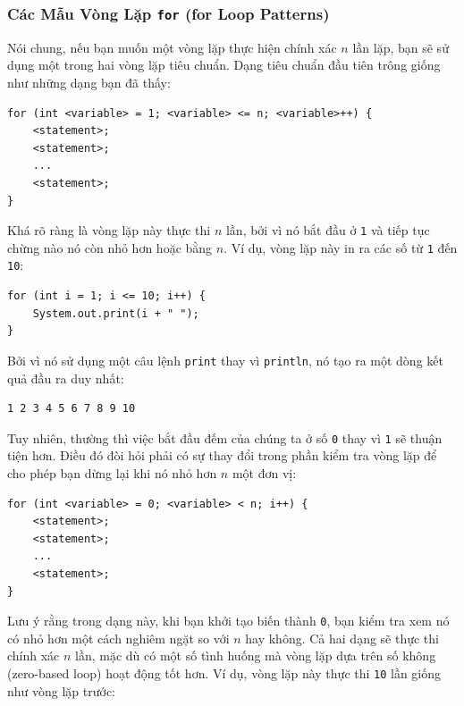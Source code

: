 \subsubsection{\texorpdfstring{Các Mẫu Vòng Lặp \texttt{for} (for Loop
Patterns)}{Các Mẫu Vòng Lặp for (for Loop Patterns)}}\label{cuxe1c-mux1eabu-vuxf2ng-lux1eb7p-for-for-loop-patterns}

Nói chung, nếu bạn muốn một vòng lặp thực hiện chính xác \(n\) lần lặp,
bạn sẽ sử dụng một trong hai vòng lặp tiêu chuẩn. Dạng tiêu chuẩn đầu
tiên trông giống như những dạng bạn đã thấy:

\begin{verbatim}
for (int <variable> = 1; <variable> <= n; <variable>++) {
    <statement>;
    <statement>;
    ...
    <statement>;
}
\end{verbatim}

Khá rõ ràng là vòng lặp này thực thi \(n\) lần, bởi vì nó bắt đầu ở
\texttt{1} và tiếp tục chừng nào nó còn nhỏ hơn hoặc bằng \(n\). Ví dụ,
vòng lặp này in ra các số từ \texttt{1} đến \texttt{10}:

\begin{verbatim}
for (int i = 1; i <= 10; i++) {
    System.out.print(i + " ");
}
\end{verbatim}

Bởi vì nó sử dụng một câu lệnh \texttt{print} thay vì \texttt{println},
nó tạo ra một dòng kết quả đầu ra duy nhất:

\begin{verbatim}
1 2 3 4 5 6 7 8 9 10
\end{verbatim}

Tuy nhiên, thường thì việc bắt đầu đếm của chúng ta ở số \texttt{0} thay
vì \texttt{1} sẽ thuận tiện hơn. Điều đó đòi hỏi phải có sự thay đổi
trong phần kiểm tra vòng lặp để cho phép bạn dừng lại khi nó nhỏ hơn
\(n\) một đơn vị:

\begin{verbatim}
for (int <variable> = 0; <variable> < n; i++) {
    <statement>;
    <statement>;
    ...
    <statement>;
}
\end{verbatim}

Lưu ý rằng trong dạng này, khi bạn khởi tạo biến thành \texttt{0}, bạn
kiểm tra xem nó có nhỏ hơn một cách nghiêm ngặt so với \(n\) hay không.
Cả hai dạng sẽ thực thi chính xác \(n\) lần, mặc dù có một số tình huống
mà vòng lặp dựa trên số không (zero-based loop) hoạt động tốt hơn. Ví
dụ, vòng lặp này thực thi \texttt{10} lần giống như vòng lặp trước:

